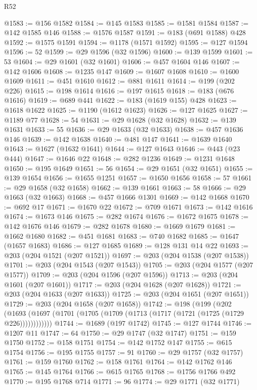 \begin{lexlean}{R52}
\begin{coremodule}
{{{{{{{{{{{{{{{{{{{{{{{{{{{{{{{{{{{{{{{{{{{{{{{{{{{{{{{{{{{{{{{{{{{{{{{{{{{{{{{{{{{{{{{{{{{{{{{{{{{{{{{{{{{{{{{{{{{{{{{{{{{{{{{{{{{{{{{{{{{{{{{{{{{{{{{{{{{{{{{{{{{{{{{{{{{{{{{{{{{{{{{{{{{{{{{{{{{{{{@1583 := @156 @1582
@1584 := @145 @1583
@1585 := @1581 @1584
@1587 := @142 @1585 @146
@1588 := @1576 @1587
@1591 := @183 (@691 @1588) @428
@1592 := @1575 @1591
@1594 := @1178 (@1571 @1592)
@1595 := @127 @1594
@1596 := 52
@1599 := @29 @1596 (@32 @1596)
@1600 := @139 @1599
@1601 := 53
@1604 := @29 @1601 (@32 @1601)
@1606 := @457 @1604 @146
@1607 := @142 @1606
@1608 := @1235 @147
@1609 := @1607 @1608
@1610 := @1600 @1609
@1611 := @451 @1610
@1612 := @881 @1611
@1614 := @199 (@202 @226)
@1615 := @198 @1614
@1616 := @197 @1615
@1618 := @183 (@676 @1616)
@1619 := @689 @441
@1622 := @183 (@1619 @155) @428
@1623 := @1618 @1622
@1625 := @1190 (@1612 @1623)
@1626 := @127 @1625
@1627 := @1189 @77
@1628 := 54
@1631 := @29 @1628 (@32 @1628)
@1632 := @139 @1631
@1633 := 55
@1636 := @29 @1633 (@32 @1633)
@1638 := @457 @1636 @146
@1639 := @142 @1638
@1640 := @481 @147
@1641 := @1639 @1640
@1643 := @1627 (@1632 @1641)
@1644 := @127 @1643
@1646 := @443 (@23 @444)
@1647 := @1646 @22
@1648 := @282 @1236
@1649 := @1231 @1648
@1650 := @195 @1649
@1651 := 56
@1654 := @29 @1651 (@32 @1651)
@1655 := @139 @1654
@1656 := @1655 @1251
@1657 := @1650 @1656
@1658 := 57
@1661 := @29 @1658 (@32 @1658)
@1662 := @139 @1661
@1663 := 58
@1666 := @29 @1663 (@32 @1663)
@1668 := @457 @1666 @1301
@1669 := @142 @1668
@1670 := @692 @17
@1671 := @1670 @22
@1672 := @709 @1671
@1673 := @142 @1616
@1674 := @1673 @146
@1675 := @282 @1674
@1676 := @1672 @1675
@1678 := @142 @1676 @146
@1679 := @282 @1678
@1680 := @1669 @1679
@1681 := @1662 @1680
@1682 := @451 @1681
@1683 := @740 @1682
@1685 := @1647 (@1657 @1683)
@1686 := @127 @1685
@1689 := @128 @131 @14 @22
@1693 := @203 (@204 @1521 (@207 @1521))
@1697 := @203 (@204 @1538 (@207 @1538))
@1701 := @203 (@204 @1543 (@207 @1543))
@1705 := @203 (@204 @1577 (@207 @1577))
@1709 := @203 (@204 @1596 (@207 @1596))
@1713 := @203 (@204 @1601 (@207 @1601))
@1717 := @203 (@204 @1628 (@207 @1628))
@1721 := @203 (@204 @1633 (@207 @1633))
@1725 := @203 (@204 @1651 (@207 @1651))
@1729 := @203 (@204 @1658 (@207 @1658))
@1742 := @198
    (@199
      (@202 (@1693 (@1697 (@1701 (@1705 (@1709 (@1713 (@1717 (@1721 (@1725 (@1729 @226))))))))))))
@1744 := @1689 (@197 @1742)
@1745 := @127 @1744
@1746 := @1207 @11
@1747 := 64
@1750 := @29 @1747 (@32 @1747)
@1751 := @159 @1750
@1752 := @158 @1751
@1754 := @142 @1752 @147
@1755 := @615 @1754
@1756 := @195 @1755
@1757 := 91
@1760 := @29 @1757 (@32 @1757)
@1761 := @159 @1760
@1762 := @158 @1761
@1764 := @142 @1762 @146
@1765 := @145 @1764
@1766 := @615 @1765
@1768 := @1756 @1766 @492
@1770 := @195 @1768 @714
@1771 := 96
@1774 := @29 @1771 (@32 @1771)
}}}}}}}}}}}}}}}}}}}}}}}}}}}}}}}}}}}}}}}}}}}}}}}}}}}}}}}}}}}}}}}}}}}}}}}}}}}}}}}}}}}}}}}}}}}}}}}}}}}}}}}}}}}}}}}}}}}}}}}}}}}}}}}}}}}}}}}}}}}}}}}}}}}}}}}}}}}}}}}}}}}}}}}}}}}}}}}}}}}}}}}}}}}}}}}}}}}}}}
\end{coremodule}
\end{lexlean}
